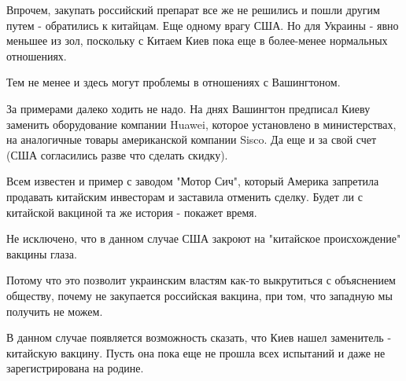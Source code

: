 Впрочем, закупать российский препарат все же не решились и пошли другим путем -
обратились к китайцам. Еще одному врагу США. Но для Украины - явно меньшее из
зол, поскольку с Китаем Киев пока еще в более-менее нормальных отношениях.

Тем не менее и здесь могут проблемы в отношениях с Вашингтоном.

За примерами далеко ходить не надо. На днях Вашингтон предписал Киеву заменить
оборудование компании Huawei, которое установлено в министерствах, на
аналогичные товары американской компании Sisco. Да еще и за свой счет (США
согласились разве что сделать скидку). 

Всем известен и пример с заводом "Мотор Сич", который Америка запретила
продавать китайским инвесторам и заставила отменить сделку. Будет ли с
китайской вакциной та же история - покажет время. 

Не исключено, что в данном случае США закроют на "китайское происхождение"
вакцины глаза. 

Потому что это позволит украинским властям как-то выкрутиться с объяснением
обществу, почему не закупается российская вакцина, при том, что западную мы
получить не можем.

В данном случае появляется возможность сказать, что Киев нашел заменитель -
китайскую вакцину. Пусть она пока еще не прошла всех испытаний и даже не
зарегистрирована на родине.

